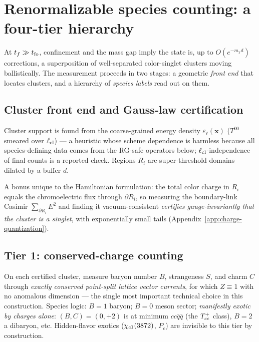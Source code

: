 \section{Renormalizable species counting: a four-tier hierarchy}
\label{sec:hierarchy}

At $t_f\gg t_{\rm fo}$, confinement and the mass gap imply the state is,
up to $O(e^{-m_\pi d})$ corrections, a superposition of well-separated
color-singlet clusters moving ballistically.  The measurement proceeds in
two stages: a geometric \emph{front end} that locates clusters, and a
hierarchy of \emph{species labels} read out on them.

\subsection{Cluster front end and Gauss-law certification}
\label{sec:front-end}

Cluster support is found from the coarse-grained energy density
$\varepsilon_\ell(\mathbf x)$ ($T^{00}$ smeared over
$\ell_{\rm cl}$) --- a heuristic whose scheme dependence is harmless
because all species-defining data comes from the RG-safe operators below;
$\ell_{\rm cl}$-independence of final counts is a reported check.  Regions
$R_i$ are super-threshold domains dilated by a buffer $d$.

A bonus unique to the Hamiltonian formulation: the total color charge in
$R_i$ equals the chromoelectric flux through $\partial R_i$, so measuring
the boundary-link Casimir $\sum_{\partial R_i} E^2$ and finding it
vacuum-consistent \emph{certifies gauge-invariantly that the cluster is a
singlet}, with exponentially small tails
(Appendix~\ref{app:charge-quantization}).

\subsection{Tier 1: conserved-charge counting}
\label{sec:tier1}

On each certified cluster, measure baryon number $B$, strangeness $S$, and
charm $C$ through \emph{exactly conserved point-split lattice vector
currents}, for which $Z\equiv 1$ with no anomalous dimension --- the single
most important technical choice in this construction.  Species logic:
$B=1$ baryon; $B=0$ meson sector; \emph{manifestly exotic by charges
alone}: $(B,C)=(0,+2)$ is at minimum $cc\bar q\bar q$ (the $T_{cc}^{+}$ class),
$B=2$ a dibaryon, etc.  Hidden-flavor exotics ($\chi_{c1}(3872)$, $P_c$) are
invisible to this tier by construction.

